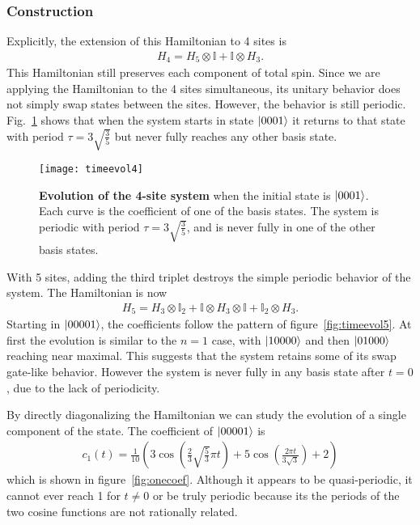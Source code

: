 \subsubsection{Construction} \label{subsub:construction} 

Explicitly, the extension of this Hamiltonian to 4 sites is
\begin{align}
H_4 = H_5\otimes\mathbb{I} + \mathbb{I}\otimes H_3.
\end{align}
This Hamiltonian still preserves each component of total spin. Since we are applying the Hamiltonian to the 4 sites simultaneous, its unitary behavior does not simply swap states between the sites. However, the behavior is still periodic. Fig.~\ref{fig:timeevol4} shows that when the system starts in state $\left|0001\right\rangle$ it returns to that state with period $\tau=3\sqrt{\frac{3}{5}}$ but never fully reaches any other basis state.
\begin{figure}
\centering
\texttt{[image: timeevol4]}
\caption{\textbf{Evolution of the 4-site system} when the initial state is $\left|0001\right\rangle$. Each curve is the coefficient of one of the basis states. The system is periodic with period $\tau=3\sqrt{\frac{3}{5}}$, and is never fully in one of the other basis states.}
\label{fig:timeevol4}
\end{figure}

With 5 sites, adding the third triplet destroys the simple periodic behavior of the system. The Hamiltonian is now
\begin{align}
H_5 = H_3\otimes\mathbb{I}_2 + \mathbb{I}\otimes H_3\otimes\mathbb{I} +
	\mathbb{I}_2\otimes H_3.
\end{align} 
Starting in $\left|00001\right\rangle$, the coefficients follow the pattern of figure~\ref{fig:timeevol5}. At first the evolution is similar to the $n=1$ case, with $\left|10000\right\rangle$ and then $\left|01000\right\rangle$ reaching near maximal. This suggests that the system retains some of its swap gate-like behavior. However the system is never fully in any basis state after $t=0$, due to the lack of periodicity.

By directly diagonalizing the Hamiltonian we can study the evolution of a single component of the state. The coefficient of $\left|00001\right\rangle$ is 
\begin{align}
c_1(t) = \frac{1}{10} \left(3 \cos \left(\frac{2}{3} \sqrt{\frac{5}{3}} \pi  t\right)+5 \cos \left(\frac{2 \pi  t}{3 \sqrt{3}}\right)+2\right)
\end{align} 
which is shown in figure~\ref{fig:onecoef}. Although it appears to be quasi-periodic, it cannot ever reach 1 for $t\ne 0$ or be truly periodic because its the periods of the two cosine functions are not rationally related.

